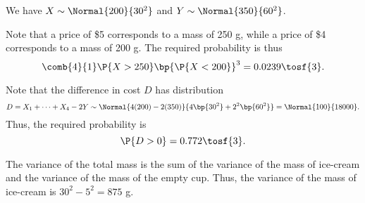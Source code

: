 \begin{solution}
    We have $X \sim \Normal{200}{30^2}$ and $Y \sim \Normal{350}{60^2}$.

    \begin{ppart}
        Note that a price of \$5 corresponds to a mass of 250 g, while a price of \$4 corresponds to a mass of 200 g. The required probability is thus \[\comb{4}{1} \P{X > 250} \bp{\P{X < 200}}^3 = 0.0239 \tosf{3}.\]
    \end{ppart}
    \begin{ppart}
        Note that the difference in cost $D$ has distribution \[D = X_1 + \dots + X_4 - 2Y \sim \Normal{4(200) - 2(350)}{4\bp{30^2} + 2^2 \bp{60^2}} = \Normal{100}{18000}.\] Thus, the required probability is \[\P{D > 0} = 0.772 \tosf{3}.\]
    \end{ppart}

    The variance of the total mass is the sum of the variance of the mass of ice-cream and the variance of the mass of the empty cup. Thus, the variance of the mass of ice-cream is $30^2 - 5^2 = 875$ g.
\end{solution}